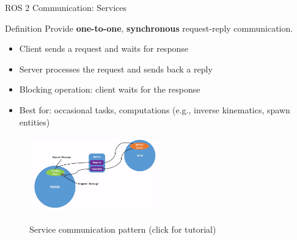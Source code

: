 \begin{frame}{ROS 2 Communication: Services}
    \begin{block}{Definition}
        Provide \textbf{one-to-one}, \textbf{synchronous} request-reply communication.
        \small
        \begin{itemize}
            \item Client sends a request and waits for response
            \item Server processes the request and sends back a reply
            \item Blocking operation: client waits for the response
            \item Best for: occasional tasks, computations (e.g., inverse kinematics, spawn entities)
        \end{itemize}
    \end{block}

    \begin{figure}
        \centering
        \href{https://docs.ros.org/en/foxy/Tutorials/Beginner-CLI-Tools/Understanding-ROS2-Services/Understanding-ROS2-Services.html}{%
            \includegraphics[width=0.5\textwidth]{img/ros2/ros2_communication_service.png}%
        }
        \caption{Service communication pattern (click for tutorial)}
    \end{figure}
\end{frame}

